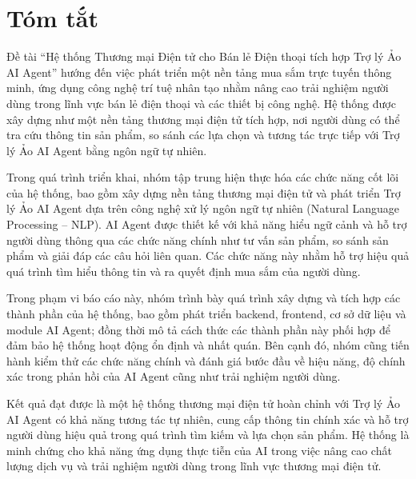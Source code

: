 \section*{Tóm tắt}
\thispagestyle{empty}
Đề tài “Hệ thống Thương mại Điện tử cho Bán lẻ Điện thoại tích hợp Trợ lý Ảo AI Agent” hướng đến việc phát triển một nền tảng mua sắm trực tuyến thông minh, ứng dụng công nghệ trí tuệ nhân tạo nhằm nâng cao trải nghiệm người dùng trong lĩnh vực bán lẻ điện thoại và các thiết bị công nghệ. Hệ thống được xây dựng như một nền tảng thương mại điện tử tích hợp, nơi người dùng có thể tra cứu thông tin sản phẩm, so sánh các lựa chọn và tương tác trực tiếp với Trợ lý Ảo AI Agent bằng ngôn ngữ tự nhiên.

Trong quá trình triển khai, nhóm tập trung hiện thực hóa các chức năng cốt lõi của hệ thống, bao gồm xây dựng nền tảng thương mại điện tử và phát triển Trợ lý Ảo AI Agent dựa trên công nghệ xử lý ngôn ngữ tự nhiên (Natural Language Processing – NLP). AI Agent được thiết kế với khả năng hiểu ngữ cảnh và hỗ trợ người dùng thông qua các chức năng chính như tư vấn sản phẩm, so sánh sản phẩm và giải đáp các câu hỏi liên quan. Các chức năng này nhằm hỗ trợ hiệu quả quá trình tìm hiểu thông tin và ra quyết định mua sắm của người dùng.

Trong phạm vi báo cáo này, nhóm trình bày quá trình xây dựng và tích hợp các thành phần của hệ thống, bao gồm phát triển backend, frontend, cơ sở dữ liệu và module AI Agent; đồng thời mô tả cách thức các thành phần này phối hợp để đảm bảo hệ thống hoạt động ổn định và nhất quán. Bên cạnh đó, nhóm cũng tiến hành kiểm thử các chức năng chính và đánh giá bước đầu về hiệu năng, độ chính xác trong phản hồi của AI Agent cũng như trải nghiệm người dùng.

Kết quả đạt được là một hệ thống thương mại điện tử hoàn chỉnh với Trợ lý Ảo AI Agent có khả năng tương tác tự nhiên, cung cấp thông tin chính xác và hỗ trợ người dùng hiệu quả trong quá trình tìm kiếm và lựa chọn sản phẩm. Hệ thống là minh chứng cho khả năng ứng dụng thực tiễn của AI trong việc nâng cao chất lượng dịch vụ và trải nghiệm người dùng trong lĩnh vực thương mại điện tử.

\clearpage
{}

